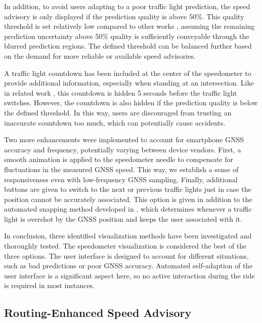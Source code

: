 In addition, to avoid users adapting to a poor traffic light prediction, the speed advisory is only displayed if the prediction quality is above 50\%. This quality threshold is set relatively low compared to other works \cite{protschky_extensive_2014, protschky_adaptive_2014}, assuming the remaining prediction uncertainty above 50\% quality is sufficiently conveyable through the blurred prediction regions. The defined threshold can be balanced further based on the demand for more reliable or available speed advisories. 

A traffic light countdown has been included at the center of the speedometer to provide additional information, especially when standing at an intersection. Like in related work \cite{stahlmann_exploring_2018, sokolov_effects_2018}, this countdown is hidden 5 seconds before the traffic light switches. However, the countdown is also hidden if the prediction quality is below the defined threshold. In this way, users are discouraged from trusting an inaccurate countdown too much, which can potentially cause accidents.

Two more enhancements were implemented to account for smartphone GNSS accuracy and frequency, potentially varying between device vendors. First, a smooth animation is applied to the speedometer needle to compensate for fluctuations in the measured GNSS speed. This way, we establish a sense of responsiveness even with low-frequency GNSS sampling. Finally, additional buttons are given to switch to the next or previous traffic lights just in case the position cannot be accurately associated. This option is given in addition to the automated snapping method developed in , which determines whenever a traffic light is overshot by the GNSS position and keeps the user associated with it.

In conclusion, three identified visualization methods have been investigated and thoroughly tested. The speedometer visualization is considered the best of the three options. The user interface is designed to account for different situations, such as bad predictions or poor GNSS accuracy. Automated self-adaption of the user interface is a significant aspect here, so no active interaction during the ride is required in most instances.

\subsection{Routing-Enhanced Speed Advisory}

